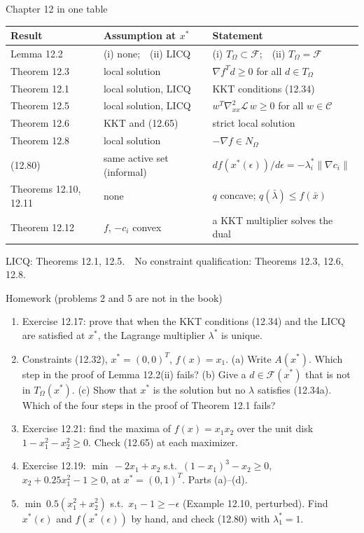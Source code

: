 \documentclass[aspectratio=169,12pt]{beamer}
\newcommand{\xs}{x^{*}}
\newcommand{\gradf}{\nabla f}
\newcommand{\ls}{\lambda^{*}}
\newcommand{\cC}{\mathcal{C}}
\newcommand{\cF}{\mathcal{F}}
\newcommand{\cL}{\mathcal{L}}
\newcommand{\TO}{T_{\Omega}}
\newcommand{\NO}{N_{\Omega}}
\newcommand{\hessL}{\nabla_{xx}^{2}\cL}
\begin{document}
\begin{frame}{Chapter 12 in one table}
  \begin{center}\small\setlength\tabcolsep{5pt}
  \renewcommand{\arraystretch}{1.08}
  \begin{tabular}{lll}
    \toprule
    Result & Assumption at $\xs$ & Statement \\
    \midrule
    Lemma 12.2 & (i) none;\ \ (ii) LICQ & (i) $\TO\subset\cF$;\ \ (ii) $\TO=\cF$ \\
    Theorem 12.3 & local solution & $\gradf^{T}d\ge 0$ for all $d\in\TO$ \\
    Theorem 12.1 & local solution, LICQ & KKT conditions (12.34) \\
    Theorem 12.5 & local solution, LICQ & $w^{T}\hessL\,w\ge 0$ for all $w\in\cC$ \\
    Theorem 12.6 & KKT and (12.65) & strict local solution \\
    Theorem 12.8 & local solution & $-\gradf\in\NO$ \\
    (12.80) & same active set (informal) & $df(\xs(\epsilon))/d\epsilon=-\ls_{i}\|\nabla c_{i}\|$ \\
    Theorems 12.10, 12.11 & none & $q$ concave; $q(\bar\lambda)\le f(\bar x)$ \\
    Theorem 12.12 & $f$, $-c_{i}$ convex & a KKT multiplier solves the dual \\
    \bottomrule
  \end{tabular}
  \end{center}
  LICQ: Theorems 12.1, 12.5.\ \ No constraint qualification: Theorems 12.3, 12.6, 12.8.
\end{frame}

\begin{frame}{Homework {\normalfont\small(problems 2 and 5 are not in the book)}}
  \begin{enumerate}\setlength\itemsep{0.45em}
    \item Exercise 12.17: prove that when the KKT conditions (12.34) and the LICQ are satisfied at
      $\xs$, the Lagrange multiplier $\ls$ is unique.
    \item Constraints (12.32), $\xs=(0,0)^{T}$, $f(x)=x_{1}$. (a) Write $A(\xs)$. Which step in the
      proof of Lemma 12.2(ii) fails? (b) Give a $d\in\cF(\xs)$ that is not in $\TO(\xs)$.
      (c) Show that $\xs$ is the solution but no $\lambda$ satisfies (12.34a). Which of the four steps
      in the proof of Theorem 12.1 fails?
    \item Exercise 12.21: find the maxima of $f(x)=x_{1}x_{2}$ over the unit disk
      $1-x_{1}^{2}-x_{2}^{2}\ge 0$. Check (12.65) at each maximizer.
    \item Exercise 12.19: $\min\,-2x_{1}+x_{2}$ s.t.\ $(1-x_{1})^{3}-x_{2}\ge 0$,
      $x_{2}+0.25x_{1}^{2}-1\ge 0$, at $\xs=(0,1)^{T}$. Parts (a)--(d).
    \item $\min\ 0.5(x_{1}^{2}+x_{2}^{2})$ s.t.\ $x_{1}-1\ge-\epsilon$ (Example 12.10, perturbed). Find $\xs(\epsilon)$ and
      $f(\xs(\epsilon))$ by hand, and check (12.80) with $\ls_{1}=1$.
  \end{enumerate}
\end{frame}
\end{document}
